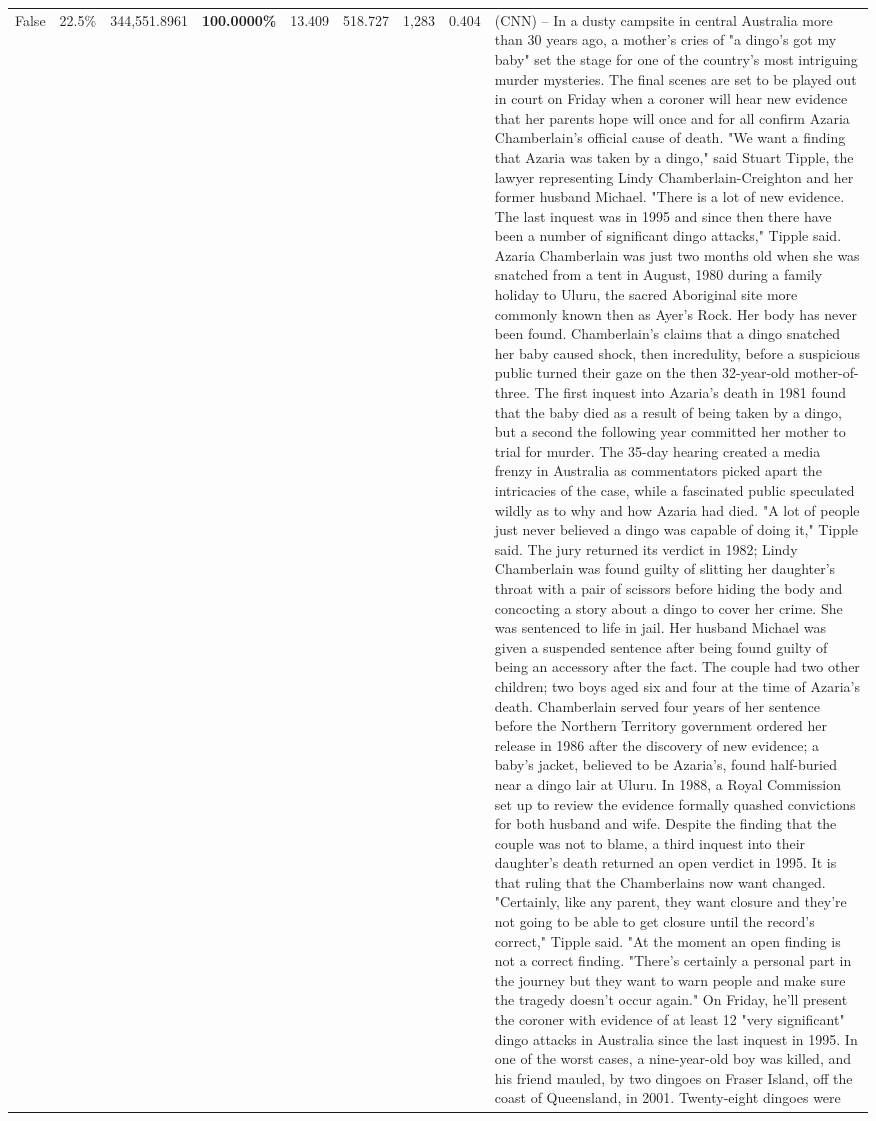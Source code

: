 \begin{table}[H]
\begin{tabular}{lllrlllll}
False & 22.5\% & 344,551.8961 & \bfseries \color{red} 100.0000\% & 13.409 & 518.727 & 1,283 & 0.404 & (CNN) -- In a dusty campsite in central Australia more than 30 years ago, a mother's cries of "a dingo's got my baby" set the stage for one of the country's most intriguing murder mysteries. The final scenes are set to be played out in court on Friday when a coroner will hear new evidence that her parents hope will once and for all confirm Azaria Chamberlain's official cause of death. "We want a finding that Azaria was taken by a dingo," said Stuart Tipple, the lawyer representing Lindy Chamberlain-Creighton and her former husband Michael. "There is a lot of new evidence. The last inquest was in 1995 and since then there have been a number of significant dingo attacks," Tipple said. Azaria Chamberlain was just two months old when she was snatched from a tent in August, 1980 during a family holiday to Uluru, the sacred Aboriginal site more commonly known then as Ayer's Rock. Her body has never been found. Chamberlain's claims that a dingo snatched her baby caused shock, then incredulity, before a suspicious public turned their gaze on the then 32-year-old mother-of-three. The first inquest into Azaria's death in 1981 found that the baby died as a result of being taken by a dingo, but a second the following year committed her mother to trial for murder. The 35-day hearing created a media frenzy in Australia as commentators picked apart the intricacies of the case, while a fascinated public speculated wildly as to why and how Azaria had died. "A lot of people just never believed a dingo was capable of doing it," Tipple said. The jury returned its verdict in 1982; Lindy Chamberlain was found guilty of slitting her daughter's throat with a pair of scissors before hiding the body and concocting a story about a dingo to cover her crime. She was sentenced to life in jail. Her husband Michael was given a suspended sentence after being found guilty of being an accessory after the fact. The couple had two other children; two boys aged six and four at the time of Azaria's death. Chamberlain served four years of her sentence before the Northern Territory government ordered her release in 1986 after the discovery of new evidence; a baby's jacket, believed to be Azaria's, found half-buried near a dingo lair at Uluru. In 1988, a Royal Commission set up to review the evidence formally quashed convictions for both husband and wife. Despite the finding that the couple was not to blame, a third inquest into their daughter's death returned an open verdict in 1995. It is that ruling that the Chamberlains now want changed. "Certainly, like any parent, they want closure and they're not going to be able to get closure until the record's correct," Tipple said. "At the moment an open finding is not a correct finding. "There's certainly a personal part in the journey but they want to warn people and make sure the tragedy doesn't occur again." On Friday, he'll present the coroner with evidence of at least 12 "very significant" dingo attacks in Australia since the last inquest in 1995. In one of the worst cases, a nine-year-old boy was killed, and his friend mauled, by two dingoes on Fraser Island, off the coast of Queensland, in 2001. Twenty-eight dingoes were 
\end{tabular}
\end{table}

